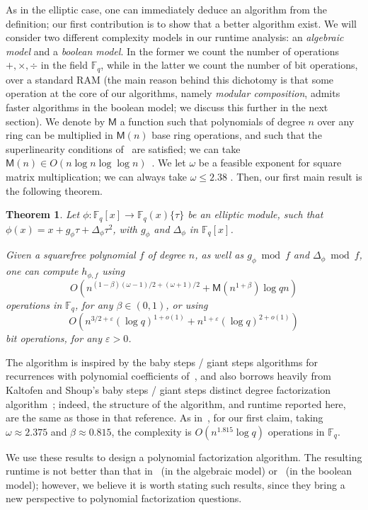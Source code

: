 \documentclass[12pt]{article}
\theoremstyle{plain}
\newtheorem{theorem}{Theorem}
\theoremstyle{definition}
\newcommand{\ang}[1]{\{#1\}}
\def\F{\ensuremath{\mathbb{F}}}
\def\MM{\ensuremath{\mathsf{M}}}
\begin{document}
As in the elliptic case, one can immediately deduce an algorithm from
the definition; our first contribution is to show that a better
algorithm exist. We will consider two different complexity models in
our runtime analysis: an \textit{algebraic model} and a
\textit{boolean model}. In the former we count the number of
operations $+, \times, \div$ in the field $\F_q$, while in the latter
we count the number of bit operations, over a standard RAM (the main
reason behind this dichotomy is that some operation at the core of our
algorithms, namely {\em modular composition}, admits faster
algorithms in the boolean model; we discuss this further in the next section).
We denote by $\MM$ a function such that polynomials of degree $n$ over
any ring can be multiplied in $\MM(n)$ base ring operations, and such
that the superlinearity conditions of~\cite[Chapter~8]{vzGG} are
satisfied; we can take $\MM(n) \in O(n\log n \log\log
n)$~\cite{CaKa91}. We let $\omega$ be a feasible exponent for square
matrix multiplication; we can always take $\omega \le 2.38$
\cite{CoWi90,LeGall14}. Then, our first main result is the following
theorem.

\begin{theorem}\label{theo:1}
  Let $\phi: \F_q[x] \to \F_q(x)\ang{\tau}$ be an elliptic
  module, such that $\phi(x)=x+ g_\phi \tau+\Delta_\phi \tau^2$, with
  $g_\phi$ and $\Delta_\phi$ in $\F_q[x]$.

  Given a squarefree polynomial $f$ of degree $n$, as well as $g_\phi
  \bmod f$ and $\Delta_\phi \bmod f$, one can compute $h_{\phi,f}$
  using
  \[O(n^{(1 - \beta)(\omega - 1) / 2 + (\omega + 1) / 2} + \MM(n^{1+\beta})\log qn)\] 
  operations in $\F_q$, for any $\beta \in (0,1)$, or using
  \[O( n^{3/2+\varepsilon} (\log q)^{1+o(1)} + n^{1+\varepsilon} (\log q)^{2+o(1)})\]
  bit operations, for any $\varepsilon > 0$.
\end{theorem}
The algorithm is inspired by the baby steps / giant steps algorithms
for recurrences with polynomial coefficients
of~\cite{Strassen76,ChCh88,BoGaSc07}, and also borrows heavily from
Kaltofen and Shoup's baby steps / giant steps distinct degree
factorization algorithm~\cite{ks}; indeed, the structure of the
algorithm, and runtime reported here, are the same as those in that
reference. As in~\cite{ks}, for our first claim, taking $\omega
\approx 2.375$ and $\beta \approx 0.815$, the complexity is
$O(n^{1.815}\log q)$ operations in $\F_q$.

We use these results to design a polynomial factorization
algorithm. The resulting runtime is not better than that in~\cite{ks}
(in the algebraic model) or~\cite{ku} (in the boolean model); however,
we believe it is worth stating such results, since they bring a new
perspective to polynomial factorization questions.
\end{document}
